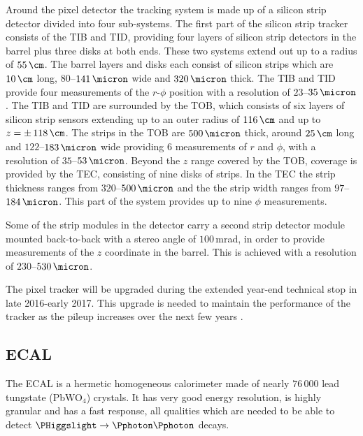 Around the pixel detector the tracking system is made up of a silicon
strip detector divided into four sub-systems. The first part of the
silicon strip tracker consists of the \ac{TIB} and \ac{TID}, providing four layers of
silicon strip detectors in the barrel plus three disks at both ends. These two systems
extend out up to a radius of $55\,\cm$. The barrel layers and disks each consist
of silicon strips which are $10\,\cm$ long, $80$--$141\,\micron$ wide and $320\,\micron$ thick. The \ac{TIB} and \ac{TID}
provide four measurements of the $r$-$\phi$ position with a resolution of $23$--$35\,\micron$. 
The \ac{TIB} and \ac{TID} are surrounded by the \ac{TOB}, which consists of six layers of silicon strip sensors extending
up to an outer radius of $116\,\cm$ and up to $z=\pm\,118\,\cm$. The strips in the \ac{TOB} are $500\,\micron$ thick, 
around $25\,\cm$ long and $122$--$183\,\micron$ 
wide providing 6 measurements of $r$ and $\phi$, with a resolution
of $35$--$53\,\micron$. Beyond the $z$ range covered by the \ac{TOB}, coverage is provided by the \ac{TEC},
consisting of nine disks of strips. In the \ac{TEC} the strip thickness ranges from $320$--$500\,\micron$ and 
the the strip width ranges from $97$--$184\,\micron$. %
This part of the system provides up to nine $\phi$ measurements.

Some of the strip modules in the detector carry a second strip detector module mounted back-to-back with a stereo angle %
of $100\,$mrad, in order to provide measurements of the $z$ coordinate in the barrel. This is achieved with a resolution of $230$--$530\,\micron$.

The pixel tracker will be upgraded during the extended year-end technical stop in late 2016-early 2017. This upgrade is needed to
maintain the performance of the tracker as the pileup increases over the next few years \cite{cms-pixel-upgrade}. %

\subsection{\acl{ECAL}}
\label{sec:CMSLHC_CMS_ecal}
The \ac{ECAL} \cite{cms-jinst} is a hermetic homogeneous calorimeter
made of nearly $76\,000$ lead tungstate (PbWO$_4$) crystals. It has very
good energy resolution, is highly granular and has a fast response, all qualities 
which are needed to be able to detect $\PHiggslight\rightarrow \Pphoton\Pphoton$ decays.

